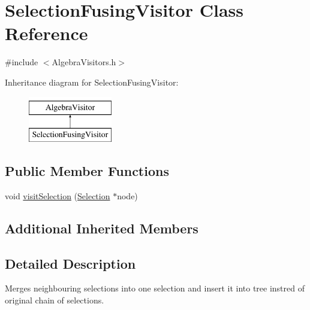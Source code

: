 \hypertarget{class_selection_fusing_visitor}{\section{Selection\+Fusing\+Visitor Class Reference}
\label{class_selection_fusing_visitor}
}


{\ttfamily \#include $<$Algebra\+Visitors.\+h$>$}

Inheritance diagram for Selection\+Fusing\+Visitor\+:\begin{figure}[H]
\begin{center}
\leavevmode
\includegraphics[height=2.000000cm]{class_selection_fusing_visitor}
\end{center}
\end{figure}
\subsection*{Public Member Functions}
\begin{DoxyCompactItemize}
\item 
void \hyperlink{class_selection_fusing_visitor_af7999d106685c9938c907c6984ba4f2d}{visit\+Selection} (\hyperlink{class_selection}{Selection} $\ast$node)
\end{DoxyCompactItemize}
\subsection*{Additional Inherited Members}


\subsection{Detailed Description}
Merges neighbouring selections into one selection and insert it into tree instred of original chain of selections. 

